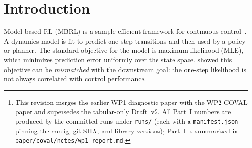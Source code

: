 \documentclass{article}
\theoremstyle{plain}
\begin{document}
\begin{abstract}
estimator (estimated-weight Bellman risk $\ge$ MLE in $100\%$ of uncapacitated regimes)
and fails for capacity-limited fitting ($50\%$/$33\%$ for VaGraM/VAML-1). For depth we
add (iv)~deep diagnostics on a differentiable MuJoCo Distractor-Gym --- an exact
policy-gradient alignment measurement (Exp~1.1) and a per-sample VJP profiling harness
(Exp~1.2). The deep diagnostic is calibrated at $d_d = 0$ and degrades only modestly with
the distractor count ($15$--$25\%$), with no value-aware family robustly beating MLE,
while exact online VJP is dispatch-bound on commodity hardware and stale-weight caching
recovers the overhead. The negative result --- estimator noise, not the loss shape, keeps
value-aware weighting from a robust win --- motivates COVAL (Part~II), a
Lyapunov-stabilized coupled model/critic algorithm that combines a two-timescale
schedule (following the Stackelberg/two-timescale principle of
ROMBRL~\citep{chen2026rombri}) with weight-estimator control; unlike ROMBRL it places the
critic on the faster timescale and targets a non-asymptotic constant-step-size bound on
$\sigma_w^2$. Its theory and experiments (EXP~2.1--2.5) are outlined here (results
pending).\footnote{This revision merges the earlier WP1
diagnostic paper with the WP2 COVAL paper and supersedes the tabular-only Draft~v2. All
Part~I numbers are produced by the committed runs under \texttt{runs/} (each with a
\texttt{manifest.json} pinning the config, git SHA, and library versions); Part~I is
summarised in \texttt{paper/coval/notes/wp1\_report.md}.}
\end{abstract}

\section{Introduction}

Model-based RL (MBRL) is a sample-efficient framework for continuous
control~\citep{deisenroth2011pilco,janner2019mbpo,hafner2023dreamerv3,hansen2024tdmpc2}.
A dynamics model is fit to predict one-step transitions and then used by a policy or
planner. The standard objective for the model is maximum likelihood (MLE), which
minimizes prediction error uniformly over the state space. \citet{lambert2020objective} showed this objective can be \emph{mismatched} with
the downstream goal: the one-step likelihood is not always correlated with control
performance.
\end{document}
